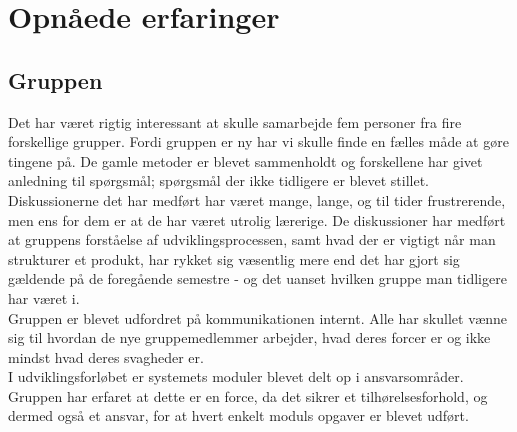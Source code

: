 \section{Opnåede erfaringer}
\label{ch:OpXP}

\subsection{Gruppen}
Det har været rigtig interessant at skulle samarbejde fem personer fra fire forskellige grupper. Fordi gruppen er ny har vi skulle finde en fælles måde at gøre tingene på. De gamle metoder er blevet sammenholdt og forskellene har givet anledning til spørgsmål; spørgsmål der ikke tidligere er blevet stillet. Diskussionerne det har medført har været mange, lange, og til tider frustrerende, men ens for dem er at de har været utrolig lærerige. De diskussioner har medført at gruppens forståelse af udviklingsprocessen, samt hvad der er vigtigt når man strukturer et produkt, har rykket sig væsentlig mere end det har gjort sig gældende på de foregående semestre - og det uanset hvilken gruppe man tidligere har været i.\\
Gruppen er blevet udfordret på kommunikationen internt. Alle har skullet vænne sig til hvordan de nye gruppemedlemmer arbejder, hvad deres forcer er og ikke mindst hvad deres svagheder er.\\
I udviklingsforløbet er systemets moduler blevet delt op i ansvarsområder. Gruppen har erfaret at dette er en force, da det sikrer et tilhørelsesforhold, og dermed også et ansvar, for at hvert enkelt moduls opgaver er blevet udført.

